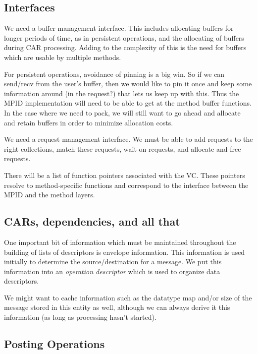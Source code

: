 \documentclass[11pt,letterpaper]{article}
\begin{document}
\subsection{Interfaces}

We need a buffer management interface.  This includes allocating buffers for
longer periods of time, as in persistent operations, and the allocating of
buffers during CAR processing.  Adding to the complexity of this is the need
for buffers which are usable by multiple methods.

For persistent operations, avoidance of pinning is a big win.  So if we can
send/recv from the user's buffer, then we would like to pin it once and keep
some information around (in the request?) that lets us keep up with this.  Thus
the MPID implementation will need to be able to get at the method buffer
functions.  In the case where we need to pack, we will still want to go ahead
and allocate and retain buffers in order to minimize allocation costs.

We need a request management interface.  We must be able to add requests to the
right collections, match these requests, wait on requests, and allocate and
free requests.

There will be a list of function pointers associated with the VC.  These
pointers resolve to method-specific functions and correspond to the interface
between the MPID and the method layers.

\subsection{CARs, dependencies, and all that}

One important bit of information which must be maintained throughout the
building of lists of descriptors is envelope information.  This information is
used initially to determine the source/destination for a message.  We put this
information into an \emph{operation descriptor} which is used to organize data
descriptors.

We might want to cache information such as the datatype map and/or size of the
message stored in this entity as well, although we can always derive it this
information (as long as processing hasn't started).

\subsection{Posting Operations}

\end{document}
